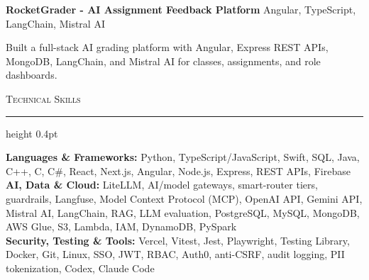 \documentclass[letterpaper,11pt]{article}
\newcommand{\resumesection}[1]{%
  \par\vspace{2pt}%
  {\large\scshape #1}\par\vspace{2pt}%
  \hrule height 0.4pt\vspace{2pt}%
}
\newcommand{\projectHeading}[2]{
  \textbf{#1} \hfill #2
}
\begin{document}
\vspace{-4pt}
\projectHeading{RocketGrader - AI Assignment Feedback Platform}{Angular, TypeScript, LangChain, Mistral AI}
\begin{tightitemize}
  \item Built a full-stack AI grading platform with Angular, Express REST APIs, MongoDB, LangChain, and Mistral AI for classes, assignments, and role dashboards.
\end{tightitemize}

\resumesection{Technical Skills}
\textbf{Languages \& Frameworks:} Python, TypeScript/JavaScript, Swift, SQL, Java, C++, C, C\#, React, Next.js, Angular, Node.js, Express, REST APIs, Firebase\\
\textbf{AI, Data \& Cloud:} LiteLLM, AI/model gateways, smart-router tiers, guardrails, Langfuse, Model Context Protocol (MCP), OpenAI API, Gemini API, Mistral AI, LangChain, RAG, LLM evaluation, PostgreSQL, MySQL, MongoDB, AWS Glue, S3, Lambda, IAM, DynamoDB, PySpark\\
\textbf{Security, Testing \& Tools:} Vercel, Vitest, Jest, Playwright, Testing Library, Docker, Git, Linux, SSO, JWT, RBAC, Auth0, anti-CSRF, audit logging, PII tokenization, Codex, Claude Code
\end{document}
